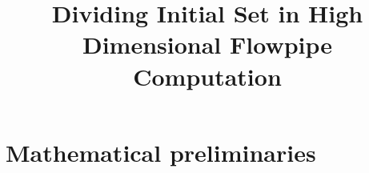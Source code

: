 


\title{Dividing Initial Set in High Dimensional Flowpipe Computation}
\author{}
\institute{}
%
    
\maketitle

\section{Mathematical preliminaries}







